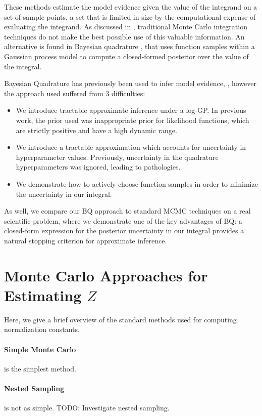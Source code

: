 \documentclass{article}
\begin{document}
These methods estimate the model evidence given the value of the integrand on a set of sample points, a set that is limited in size by the computational expense of evaluating the integrand. As discussed in \citep{MCUnsound}, traditional Monte Carlo integration techniques do not make the best possible use of this valuable information. An alternative is found in Bayesian quadrature \citep{BZHermiteQuadrature}, that uses function samples within a Gaussian process model to compute a closed-formed posterior over the value of the integral.

Bayesian Quadrature has previously been used to infer model evidence, \citep{BZMonteCarlo}, however the approach used suffered from 3 difficulties: 
\begin{itemize}
\item We introduce tractable approximate inference under a log-GP.  In previous work, the \gpb prior used was inappropriate prior for likelihood functions, which are strictly positive and have a high dynamic range.
\item We introduce a tractable approximation which accounts for uncertainty in hyperparameter values.  Previously, uncertainty in the quadrature hyperparameters was ignored, leading to pathologies.
\item We demonstrate how to actively choose function samples in order to minimize the uncertainty in our integral.
\end{itemize}
As well, we compare our BQ approach to standard MCMC techniques on a real scientific problem, where we demonstrate one of the key advantages of BQ: a closed-form expression for the posterior uncertainty in our integral provides a natural stopping criterion for approximate inference.

\section{Monte Carlo Approaches for Estimating $Z$}

Here, we give a brief overview of the standard methods used for computing normalization constants.

\paragraph*{Simple Monte Carlo} is the simplest method.
\paragraph*{Nested Sampling} is not as simple. TODO: Investigate nested sampling.
\end{document}
